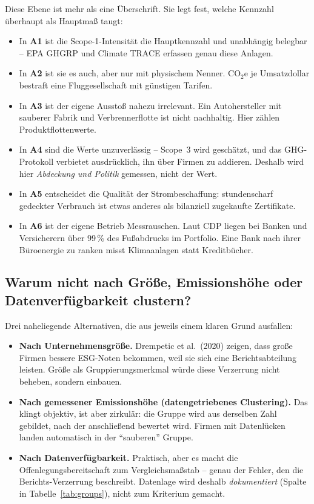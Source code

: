 \documentclass[11pt,a4paper]{article}
\newcommand{\coeq}{\ensuremath{\mathrm{CO}_{2}\mathrm{e}}}
\begin{document}
\begin{table}[htbp]
\caption{Die \NArchetypes{} Wirkungsort-Archetypen}
\label{tab:archetypes}
\small

\end{table}

Diese Ebene ist mehr als eine Überschrift. Sie legt fest, welche Kennzahl überhaupt als Hauptmaß taugt:

\begin{itemize}
\item In \textbf{A1} ist die Scope-1-Intensität die Hauptkennzahl und unabhängig belegbar -- EPA GHGRP und Climate TRACE erfassen genau diese Anlagen.
\item In \textbf{A2} ist sie es auch, aber nur mit physischem Nenner. \coeq{} je Umsatzdollar bestraft eine Fluggesellschaft mit günstigen Tarifen.
\item In \textbf{A3} ist der eigene Ausstoß nahezu irrelevant. Ein Autohersteller mit sauberer Fabrik und Verbrennerflotte ist nicht nachhaltig. Hier zählen Produktflottenwerte.
\item In \textbf{A4} sind die Werte unzuverlässig -- Scope~3 wird geschätzt, und das GHG-Protokoll verbietet ausdrücklich, ihn über Firmen zu addieren. Deshalb wird hier \emph{Abdeckung und Politik} gemessen, nicht der Wert.
\item In \textbf{A5} entscheidet die Qualität der Strombeschaffung: stundenscharf gedeckter Verbrauch ist etwas anderes als bilanziell zugekaufte Zertifikate.
\item In \textbf{A6} ist der eigene Betrieb Messrauschen. Laut CDP liegen bei Banken und Versicherern über 99\,\% des Fußabdrucks im Portfolio. Eine Bank nach ihrer Büroenergie zu ranken misst Klimaanlagen statt Kreditbücher.
\end{itemize}

\subsection{Warum nicht nach Größe, Emissionshöhe oder Datenverfügbarkeit clustern?}

Drei naheliegende Alternativen, die aus jeweils einem klaren Grund ausfallen:

\begin{itemize}
\item \textbf{Nach Unternehmensgröße.} Drempetic et al.\ (2020) zeigen, dass große Firmen bessere ESG-Noten bekommen, weil sie sich eine Berichtsabteilung leisten. Größe als Gruppierungsmerkmal würde diese Verzerrung nicht beheben, sondern einbauen.
\item \textbf{Nach gemessener Emissionshöhe (datengetriebenes Clustering).} Das klingt objektiv, ist aber zirkulär: die Gruppe wird aus derselben Zahl gebildet, nach der anschließend bewertet wird. Firmen mit Datenlücken landen automatisch in der ``sauberen'' Gruppe.
\item \textbf{Nach Datenverfügbarkeit.} Praktisch, aber es macht die Offenlegungsbereitschaft zum Vergleichsmaßstab -- genau der Fehler, den die Berichts-Verzerrung beschreibt. Datenlage wird deshalb \emph{dokumentiert} (Spalte in Tabelle~\ref{tab:groups}), nicht zum Kriterium gemacht.
\end{itemize}
\end{document}

